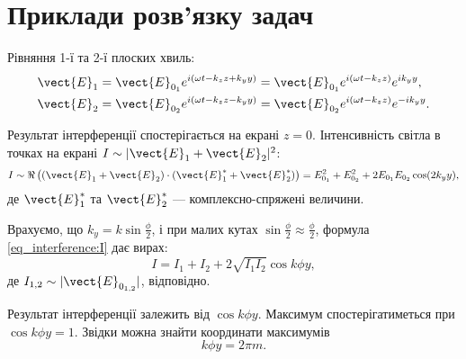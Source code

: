 \section{Приклади розв'язку задач}



\begin{solutionexample}

   	\begin{center}
   		
   	\end{center}

	Рівняння 1-ї та 2-ї плоских хвиль:
	\begin{align*}\label{}
		\vect{E}_1 & = \vect{E}_{0_1} e^{i(\omega t - k_zz + k_yy)} = \vect{E}_{0_1} e^{i(\omega t - k_zz)} e^{ik_yy},  \\
		\vect{E}_2 & = \vect{E}_{0_2} e^{i(\omega t - k_zz - k_yy)} = \vect{E}_{0_2} e^{i(\omega t - k_zz)} e^{-ik_yy}.
	\end{align*}

	Результат інтерференції спостерігається на екрані $z = 0$. Інтенсивність світла в точках на екрані $I \sim |\vect{E}_1 + \vect{E}_2|^2$:
	\begin{equation}\label{eq_interference:I}
		I \sim \Re\left((\vect{E}_1 + \vect{E}_2)\cdot (\vect{E}^*_1 + \vect{E}^*_2)\right)   =  E_{0_1}^2 + E_{0_2}^2 + 2 E_{0_1} E_{0_2}  \cos(2k_yy),
	\end{equation}
	де $\vect{E}^*_1$ та $\vect{E}^*_2$ --- комплексно-спряжені величини.

	Врахуємо, що $k_y = k\sin\frac\phi2$, і при малих кутах $\sin\frac\phi2 \approx \frac\phi2$, формула \eqref{eq_interference:I} дає вирах:
	\begin{equation}\label{}
		I = I_1 + I_2 + 2\sqrt{I_1I_2}\cos k\phi y,
	\end{equation}
	де $I_{1,2} \sim |\vect{E}_{0_{1,2}}|$, відповідно.

	Результат інтерференції залежить від $\cos k \phi y$. Максимум спостерігатиметься при $\cos k \phi y = 1$. Звідки можна знайти координати максимумів
	\begin{equation*}
		k \phi y = 2\pi m.
	\end{equation*}


\end{solutionexample}
